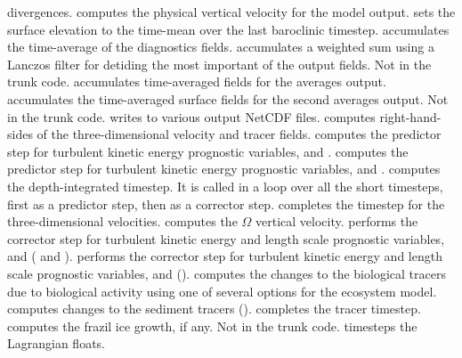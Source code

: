 \begin{klist}
  divergences.
   computes the physical vertical velocity for the
  model output.
   sets the surface elevation to the time-mean over the
  last baroclinic timestep.
   accumulates the time-average of the diagnostics
  fields.
   accumulates a weighted sum using a Lanczos filter
  for detiding the most important of the output fields. Not in the trunk
  code.
   accumulates time-averaged fields for the averages
  output.
   accumulates the time-averaged surface fields for the
  second averages output. Not in the trunk code.
   writes to various output NetCDF files.
   computes right-hand-sides of the three-dimensional
  velocity and tracer fields.
   computes the predictor step for turbulent
  kinetic energy prognostic variables,  and .
   computes the predictor step for turbulent
  kinetic energy prognostic variables,  and .
   computes the depth-integrated timestep. It is called in
  a loop over all the short timesteps, first as a predictor step, then
  as a corrector step.
   completes the timestep for the three-dimensional
  velocities.
   computes the $\Omega$ vertical velocity.
   performs the corrector step for turbulent kinetic
  energy and length scale prognostic variables,  and 
  (\cite{Mellor82} and \cite{Galperin88}).
   performs the corrector step for turbulent kinetic
  energy and length scale prognostic variables,  and 
  (\cite{Umlauf2001}).
   computes the changes to the biological tracers due to
  biological activity using one of several options for the ecosystem
  model.
   computes changes to the sediment tracers
  (\cite{Warner_2008}).
   completes the tracer timestep.
   computes the frazil ice growth, if any. Not in the
  trunk code.
   timesteps the Lagrangian floats.
\end{klist}

